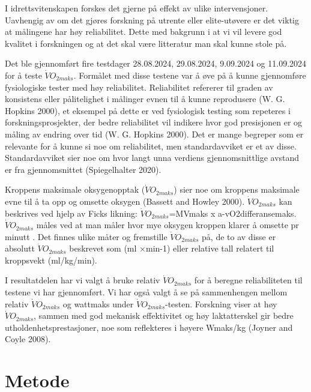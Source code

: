 \documentclass[
  letterpaper,
  DIV=11,
  numbers=noendperiod]{scrreprt}
\begin{document}
I idrettsvitenskapen forskes det gjerne på effekt av ulike
intervensjoner. Uavhengig av om det gjøres forskning på utrente eller
elite-utøvere er det viktig at målingene har høy reliabilitet. Dette med
bakgrunn i at vi vil levere god kvalitet i forskningen og at det skal
være litteratur man skal kunne stole på.

Det ble gjennomført fire testdager 28.08.2024, 29.08.2024, 9.09.2024 og
11.09.2024 for å teste \(\dot{V}O_{2maks}\). Formålet med disse testene
var å øve på å kunne gjennomføre fysiologiske tester med høy
reliabilitet. Reliabilitet refererer til graden av konsistens eller
pålitelighet i målinger evnen til å kunne reprodusere (W. G. Hopkins
2000), et eksempel på dette er ved fysiologisk testing som repeteres i
forskningsprosjekter, der bedre reliabilitet vil indikere hvor god
presisjonen er og måling av endring over tid (W. G. Hopkins 2000). Det
er mange begreper som er relevante for å kunne si noe om reliabilitet,
men standardavviket er et av disse. Standardavviket sier noe om hvor
langt unna verdiens gjennomsnittlige avstand er fra gjennomsnittet
(Spiegelhalter 2020).

Kroppens maksimale oksygenopptak (\(\dot{V}O_{2maks}\)) sier noe om
kroppens maksimale evne til å ta opp og omsette oksygen (Bassett and
Howley 2000). \(\dot{V}O_{2maks}\) kan beskrives ved hjelp av Ficks
likning: \(\dot{V}O_{2maks}\)=MVmaks x a-vO2differansemaks.
\(\dot{V}O_{2maks}\) måles ved at man måler hvor mye oksygen kroppen
klarer å omsette pr minutt . Det finnes ulike måter og fremstille
\(\dot{V}O_{2maks}\) på, de to av disse er absolutt \(\dot{V}O_{2maks}\)
beskrevet som (ml ×min-1) eller relative tall relatert til kroppsvekt
(ml/kg/min).

I resultatdelen har vi valgt å bruke relativ \(\dot{V}O_{2maks}\) for å
beregne reliabiliteten til testene vi har gjennomført. Vi har også valgt
å se på sammenhengen mellom relativ \(\dot{V}O_{2maks}\) og wattmaks
under \(\dot{V}O_{2maks}\)-testen. Forskning viser at høy
\(\dot{V}O_{2maks}\), sammen med god mekanisk effektivitet og høy
laktatterskel gir bedre utholdenhetsprestasjoner, noe som reflekteres i
høyere Wmaks/kg (Joyner and Coyle 2008).

\section{Metode}\label{metode}
\end{document}
